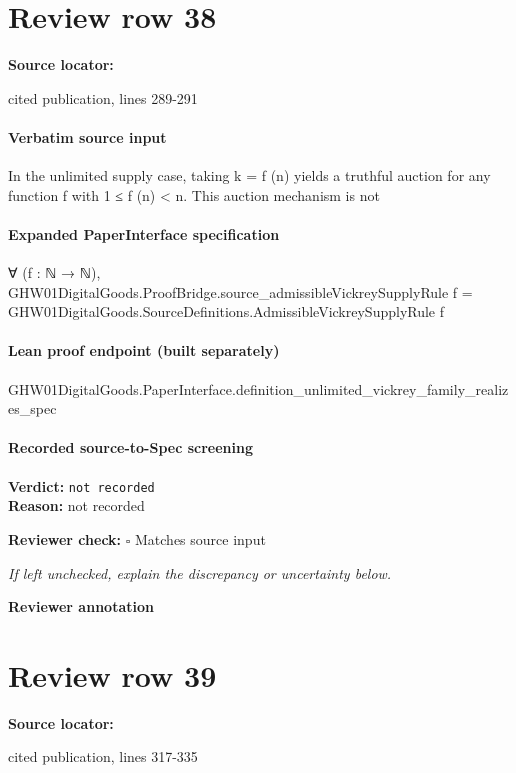 \documentclass[10pt]{article}
\newcommand{\reviewerbox}{%
  \par\noindent\fbox{\parbox{0.96\linewidth}{\rule{0pt}{0.38in}}}\par
}
\newcommand{\reviewmatch}[1]{%
  \par\noindent\textbf{Reviewer check:} $\square$\; #1\par
  \noindent\emph{If left unchecked, explain the discrepancy or uncertainty below.}\par
}
\begin{document}
\section*{Review row 38}
\textbf{Source locator:} {\footnotesize\raggedright cited publication, lines 289-\allowbreak{}291\par}
\paragraph{Verbatim source input}
\begin{ReviewVerbatim}
In the unlimited supply case, taking k = f (n)
yields a truthful auction for any function f with
1 ≤ f (n) < n. This auction mechanism is not
\end{ReviewVerbatim}


\paragraph{Expanded PaperInterface specification}
\begin{ReviewVerbatim}
∀ (f : ℕ → ℕ),
  GHW01DigitalGoods.ProofBridge.source_admissibleVickreySupplyRule f =
    GHW01DigitalGoods.SourceDefinitions.AdmissibleVickreySupplyRule f
\end{ReviewVerbatim}

\paragraph{Lean proof endpoint (built separately)}\begin{ReviewVerbatim}
GHW01DigitalGoods.PaperInterface.definition_unlimited_vickrey_family_realizes_spec
\end{ReviewVerbatim}

\paragraph{Recorded source-to-Spec screening}
\textbf{Verdict:} \texttt{not recorded}
\\
\textbf{Reason:} not recorded
\reviewmatch{Matches source input}
\noindent\textbf{Reviewer annotation}\par
\reviewerbox
\clearpage
\hypertarget{source-claim-96bf38ca93d360a1}{}
\section*{Review row 39}
\textbf{Source locator:} {\footnotesize\raggedright cited publication, lines 317-\allowbreak{}335\par}
\end{document}
